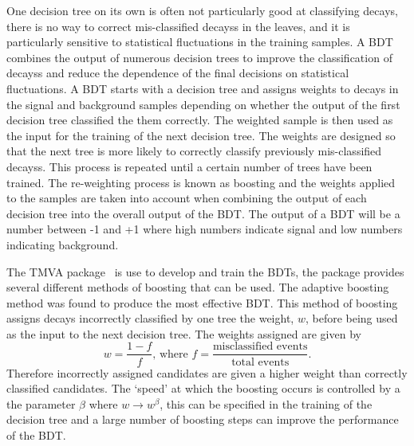 One decision tree on its own is often not particularly good at classifying decays, there is no way to correct mis-classified decayss in the leaves, and it is particularly sensitive to statistical fluctuations in the training samples. A BDT combines the output of numerous decision trees to improve the classification of decayss and reduce the dependence of the final decisions on statistical fluctuations. A BDT starts with a decision tree and assigns weights to decays in the signal and background samples depending on whether the output of the first decision tree classified the them correctly. The weighted sample is then used as the input for the training of the next decision tree. The weights are designed so that the next tree is more likely to correctly classify previously mis-classified decayss. This process is repeated until a certain number of trees have been trained. The re-weighting process is known as boosting and the weights applied to the samples are taken into account when combining the output of each decision tree into the overall output of the BDT. The output of a BDT will be a number between -1 and +1 where high numbers indicate signal and low numbers indicating background.


The TMVA package~\cite{Hocker:2007ht} is use to develop and train the BDTs, the package provides several different methods of boosting that can be used. The adaptive boosting method was found to produce the most effective BDT.
This method of boosting assigns decays incorrectly classified by one tree the weight, $w$, before being used as the input to the next decision tree. The weights assigned are given by
\begin{equation}
w = \frac{1 - f}{f}\text{, where } f = \frac{\text{misclassified events}}{\text{total events}}.
\end{equation}
Therefore incorrectly assigned candidates are given a higher weight than correctly classified candidates. The `speed’ at which the boosting occurs is controlled by a the parameter $\beta$ where $w \rightarrow w^{\beta}$, this can be specified in the training of the decision tree and a large number of boosting steps can improve the performance of the BDT.

